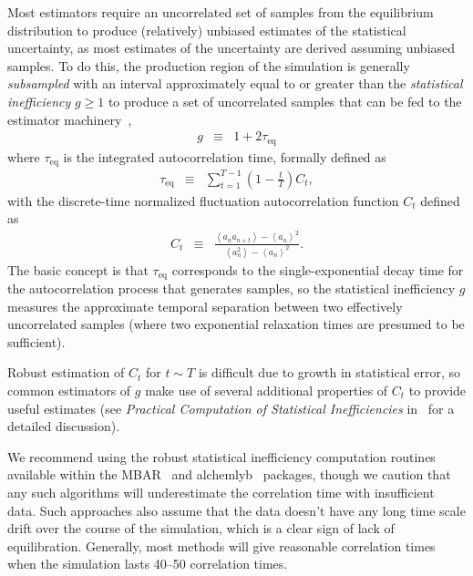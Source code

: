 \documentclass[9pt,bestpractices]{livecoms}
\newcommand{\expect}[1]{\left\langle{#1}\right\rangle}
\begin{document}
Most estimators require an uncorrelated set of samples from the equilibrium distribution to produce (relatively) unbiased estimates of the statistical uncertainty, as most estimates of the uncertainty are derived assuming unbiased samples.
To do this, the production region of the simulation is generally \emph{subsampled} with an interval approximately equal to or greater than the \emph{statistical inefficiency} $g \ge 1$ to produce a set of uncorrelated samples that can be fed to the estimator machinery~\cite{chodera2016simple},
\begin{eqnarray}
g &\equiv& 1 + 2 \tau_\mathrm{eq} \label{eq:statistical-inefficiency-definition}
\end{eqnarray}
where $\tau_\mathrm{eq}$ is the integrated autocorrelation time, formally defined as
\begin{eqnarray}
\tau_\mathrm{eq} &\equiv& \sum_{t=1}^{T-1} \left(1 - \frac{t}{T}\right) C_t \label{eq:integrated-autocorrelation-time-definition} , 
\end{eqnarray}
with the discrete-time normalized fluctuation autocorrelation function $C_t$ defined as
\begin{eqnarray}
C_t &\equiv& \frac{\expect{a_n a_{n+t}} - \expect{a_n}^2}{\expect{a_n^2} - \expect{a_n}^2} . \label{equation:autocorrelation-definition}
\end{eqnarray}
The basic concept is that $\tau_\mathrm{eq}$ corresponds to the single-exponential decay time for the autocorrelation process that generates samples, so the statistical inefficiency $g$ measures the approximate temporal separation between two effectively uncorrelated samples (where two exponential relaxation times are presumed to be sufficient).

Robust estimation of $C_t$ for $t \sim T$ is difficult due to growth in statistical error, so common estimators of $g$ make use of several additional properties of $C_t$ to provide useful estimates (see \emph{Practical Computation of Statistical Inefficiencies} in~\cite{chodera2016simple} for a detailed discussion).

We recommend using the robust statistical inefficiency computation routines available within the MBAR~\cite{kylebeauchamp2019choderalab} and alchemlyb~\cite{daviddotson2019alchemistry} packages, though we caution that any such algorithms will underestimate the correlation time with insufficient data. Such approaches also assume that the data doesn't have any long time scale drift over the course of the simulation, which is a clear sign of lack of equilibration.  Generally, most methods will give reasonable correlation times when the simulation lasts 40--50 correlation times.
\end{document}

